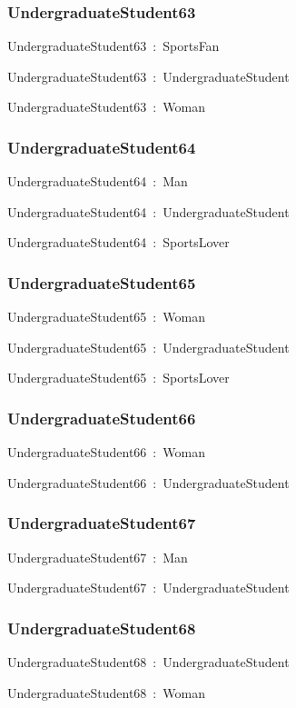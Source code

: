 \documentclass{article}
\begin{document}
\subsubsection*{UndergraduateStudent63}

UndergraduateStudent63~:~SportsFan

UndergraduateStudent63~:~UndergraduateStudent

UndergraduateStudent63~:~Woman

\subsubsection*{UndergraduateStudent64}

UndergraduateStudent64~:~Man

UndergraduateStudent64~:~UndergraduateStudent

UndergraduateStudent64~:~SportsLover

\subsubsection*{UndergraduateStudent65}

UndergraduateStudent65~:~Woman

UndergraduateStudent65~:~UndergraduateStudent

UndergraduateStudent65~:~SportsLover

\subsubsection*{UndergraduateStudent66}

UndergraduateStudent66~:~Woman

UndergraduateStudent66~:~UndergraduateStudent

\subsubsection*{UndergraduateStudent67}

UndergraduateStudent67~:~Man

UndergraduateStudent67~:~UndergraduateStudent

\subsubsection*{UndergraduateStudent68}

UndergraduateStudent68~:~UndergraduateStudent

UndergraduateStudent68~:~Woman
\end{document}
